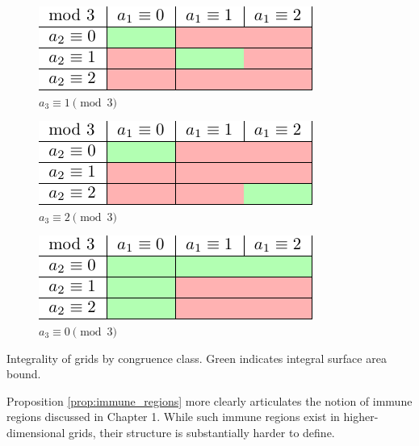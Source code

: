 \begin{table}[]
\centering
\begin{subfigure}{0.3\textwidth}
	\includegraphics[width=\textwidth]{tables/1/integral_bounds_thickness_1.pdf}
	\caption{$a_3 \equiv 1 \pmod 3$}
	\label{tab:integral_bounds_a}
\end{subfigure} \hfill%
\begin{subfigure}{0.3\textwidth}
	\includegraphics[width=\textwidth]{tables/1/integral_bounds_thickness_2.pdf}
	\caption{$a_3 \equiv 2 \pmod 3$}
	\label{tab:integral_bounds_b}
\end{subfigure} \hfill%
\begin{subfigure}{0.3\textwidth}
	\includegraphics[width=\textwidth]{tables/1/integral_bounds_thickness_3.pdf}
	\caption{$a_3 \equiv 0 \pmod 3$}
	\label{tab:integral_bounds_c}
\end{subfigure}
\caption{Integrality of grids by congruence class. Green indicates integral surface area bound.}
\label{tab:integral_bounds}
\end{table} 

Proposition \ref{prop:immune_regions} more clearly articulates the notion of immune regions discussed in Chapter 1. While such immune regions exist in higher-dimensional grids, their structure is substantially harder to define. 

